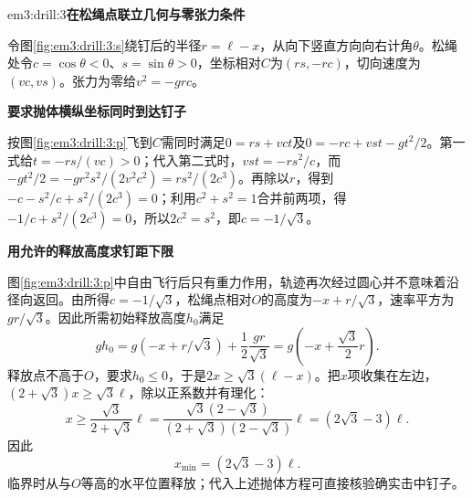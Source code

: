 \begin{drillsolution}{em3:drill:3}\textbf{在松绳点联立几何与零张力条件}\par\nobreak
令图\ref{fig:em3:drill:3:s}绕钉后的半径$r=\ell-x$，从向下竖直方向向右计角$\theta$。松绳处令$c=\cos\theta<0$、$s=\sin\theta>0$，坐标相对$C$为$(rs,-rc)$，切向速度为$(vc,vs)$。张力为零给$v^2=-grc$。



\par\medskip{}\noindent\textbf{要求抛体横纵坐标同时到达钉子}\par\nobreak
按图\ref{fig:em3:drill:3:p}飞到$C$需同时满足$0=rs+vct$及$0=-rc+vst-gt^2/2$。第一式给$t=-rs/(vc)>0$；代入第二式时，$vst=-rs^2/c$，而$-gt^2/2=-gr^2s^2/(2v^2c^2)=rs^2/(2c^3)$。再除以$r$，得到$-c-s^2/c+s^2/(2c^3)=0$；利用$c^2+s^2=1$合并前两项，得$-1/c+s^2/(2c^3)=0$，所以$2c^2=s^2$，即$c=-1/\sqrt3$。



\par\medskip{}\noindent\textbf{用允许的释放高度求钉距下限}\par\nobreak
图\ref{fig:em3:drill:3:p}中自由飞行后只有重力作用，轨迹再次经过圆心并不意味着沿径向返回。由所得$c=-1/\sqrt3$，松绳点相对$O$的高度为$-x+r/\sqrt3$，速率平方为$gr/\sqrt3$。因此所需初始释放高度$h_0$满足
\[gh_0=g(-x+r/\sqrt3)+\frac12\frac{gr}{\sqrt3}=g\left(-x+\frac{\sqrt3}{2}r\right).\]
释放点不高于$O$，要求$h_0\le0$，于是$2x\ge\sqrt3(\ell-x)$。把$x$项收集在左边，$(2+\sqrt3)x\ge\sqrt3\ell$，除以正系数并有理化：
\[
x\ge\frac{\sqrt3}{2+\sqrt3}\ell
=\frac{\sqrt3(2-\sqrt3)}{(2+\sqrt3)(2-\sqrt3)}\ell
=(2\sqrt3-3)\ell.
\]
因此
\[\boxed{x_{\min}=(2\sqrt3-3)\ell}.\]
临界时从与$O$等高的水平位置释放；代入上述抛体方程可直接核验确实击中钉子。\end{drillsolution}
